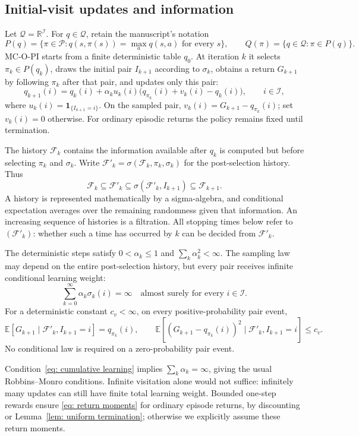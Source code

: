 \subsection{Initial-visit updates and information}
Let $\mathcal Q=\mathbb R^{\mathcal I}$. For $q\in\mathcal Q$, retain the manuscript's notation
\[
P(q)=\{\pi\in\mathcal P:q(s,\pi(s))=\max_a q(s,a)\text{ for every }s\},
\qquad Q(\pi)=\{q\in\mathcal Q:\pi\in P(q)\}.
\]
MC-O-PI starts from a finite deterministic table $q_0$. At iteration $k$ it selects $\pi_k\in P(q_k)$, draws the initial pair $I_{k+1}$ according to $\sigma_k$, obtains a return $G_{k+1}$ by following $\pi_k$ after that pair, and updates only this pair:
\begin{equation}\label{eq: update q with chi}
q_{k+1}(i)=q_k(i)+\alpha_k u_k(i)\bigl(q_{\pi_k}(i)+v_k(i)-q_k(i)\bigr),\qquad i\in\mathcal I,
\end{equation}
where $u_k(i)=\mathbf1_{\{I_{k+1}=i\}}$. On the sampled pair, $v_k(i)=G_{k+1}-q_{\pi_k}(i)$; set $v_k(i)=0$ otherwise. For ordinary episodic returns the policy remains fixed until termination.

The history $\mathcal F_k$ contains the information available after $q_k$ is computed but before selecting $\pi_k$ and $\sigma_k$. Write $\mathcal F'_k=\sigma(\mathcal F_k,\pi_k,\sigma_k)$ for the post-selection history. Thus
\[
\mathcal F_k\subseteq\mathcal F'_k\subseteq\sigma(\mathcal F'_k,I_{k+1})\subseteq\mathcal F_{k+1}.
\]
A history is represented mathematically by a sigma-algebra, and conditional expectation averages over the remaining randomness given that information. An increasing sequence of histories is a filtration. All stopping times below refer to $(\mathcal F'_k)$: whether such a time has occurred by $k$ can be decided from $\mathcal F'_k$.

\begin{assumption}\label{asp: standing}
The deterministic steps satisfy $0<\alpha_k\le1$ and $\sum_k\alpha_k^2<\infty$. The sampling law may depend on the entire post-selection history, but every pair receives infinite conditional learning weight:
\begin{equation}\label{eq: cumulative learning}
\sum_{k=0}^\infty\alpha_k\sigma_k(i)=\infty\quad\text{almost surely for every }i\in\mathcal I.
\end{equation}
For a deterministic constant $c_v<\infty$, on every positive-probability pair event,
\begin{equation}\label{eq: return moments}
\mathbb E[G_{k+1}\mid\mathcal F'_k,I_{k+1}=i]=q_{\pi_k}(i),\qquad
\mathbb E[(G_{k+1}-q_{\pi_k}(i))^2\mid\mathcal F'_k,I_{k+1}=i]\le c_v.
\end{equation}
No conditional law is required on a zero-probability pair event.
\end{assumption}
Condition~\eqref{eq: cumulative learning} implies $\sum_k\alpha_k=\infty$, giving the usual Robbins--Monro conditions. Infinite visitation alone would not suffice: infinitely many updates can still have finite total learning weight. Bounded one-step rewards ensure \eqref{eq: return moments} for ordinary episode returns, by discounting or Lemma~\ref{lem: uniform termination}; otherwise we explicitly assume these return moments.

